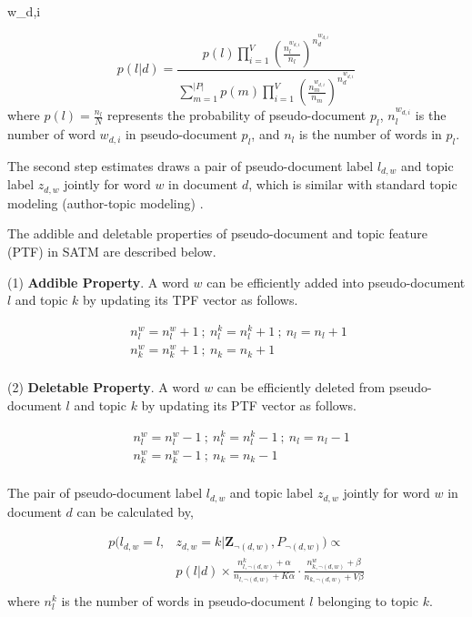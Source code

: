 \documentclass[10pt,journal,compsoc]{IEEEtran}
\begin{document}
{w_{d,i}

\begin{equation}
p(l|d)=\frac{p(l)\prod_{i=1}^V(\frac{n_{l}^{w_{d,i}}}{n_{l}})^{n_{d}^{w_{d,i}}}}{\sum_{m=1}^{|P|}p(m)\prod_{i=1}^V(\frac{n_{m}^{w_{d,i}}}{n_{m}})^{n_{d}^{w_{d,i}}}}
\end{equation}
where $p(l)=\frac{n_l}{N}$ represents the probability of pseudo-document $p_l$, $n_{l}^{w_{d,i}}$ is the number of word $w_{d,i}$ in pseudo-document $p_l$, and $n_{l}$ is the number of words in $p_l$.

The second step estimates draws a pair of pseudo-document label $l_{d,w}$ and topic label $z_{d,w}$ jointly for word $w$ in document $d$, which is similar with standard topic modeling (author-topic modeling) \cite{rosen-zvi2004author}. 

The addible and deletable properties of pseudo-document and topic feature (PTF) in SATM are described below.

(1) \textbf{Addible Property}. A word $w$ can be efficiently added into pseudo-document $l$ and topic $k$ by updating its TPF vector as follows.

\[
\begin{split}
 & n^{w}_l = n^w_l + 1 \ ; \ n_l^k = n_l^k + 1 \ ; \ n_l = n_l + 1 \ \ \\
 & n^w_k = n^w_k + 1 \ ; \ n_k = n_k + 1\\
\end{split}
\]

(2) \textbf{Deletable Property}. A word $w$ can be efficiently deleted from pseudo-document $l$ and topic $k$ by updating its PTF vector as follows.

\[
\begin{split}
  & n^{w}_l = n^w_l - 1 \ ; \ n_l^k = n_l^k - 1 \ ; \ n_l = n_l - 1 \\
 & n^w_k = n^w_k - 1 \ ; \ n_k = n_k - 1\\
\end{split}
\]


The pair of pseudo-document label $l_{d,w}$ and topic label $z_{d,w}$ jointly for word $w$ in document $d$ can be calculated by, 

\begin{equation}
\begin{split}
p(l_{d,w}=l,&z_{d,w}=k|\textbf{Z}_{\neg(d,w)}, P_{\neg(d,w)})\propto \\
& p(l|d) \times\frac{n_{l,\neg(d,w)}^k+\alpha}{n_{l,\neg(d,w)}+K\alpha}\cdot\frac{n_{k,\neg(d,w)}^w+\beta}{n_{k,\neg(d,w)}+V\beta}\\
\end{split}
\end{equation}
where $n_l^k$ is the number of words in pseudo-document $l$ belonging to topic $k$.

}
\end{document}
